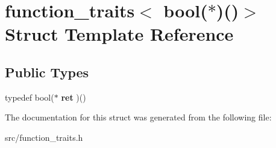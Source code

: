 \hypertarget{structfunction__traits_3_01bool_07_5_08_07_08_4}{\section{function\-\_\-traits$<$ bool($\ast$)()$>$ Struct Template Reference}
\label{structfunction__traits_3_01bool_07_5_08_07_08_4}
}
\subsection*{Public Types}
\begin{DoxyCompactItemize}
\item 
\hypertarget{structfunction__traits_3_01bool_07_5_08_07_08_4_a4fb3027afcdad3fea4054cbf4312cc53}{typedef bool($\ast$ {\bfseries ret} )()}\label{structfunction__traits_3_01bool_07_5_08_07_08_4_a4fb3027afcdad3fea4054cbf4312cc53}

\end{DoxyCompactItemize}


The documentation for this struct was generated from the following file\-:\begin{DoxyCompactItemize}
\item 
src/function\-\_\-traits.\-h\end{DoxyCompactItemize}

